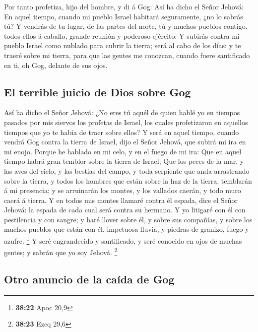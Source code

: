  Por tanto profetiza, hijo del hombre, y di á Gog: Así ha
dicho el Señor Jehová: En aquel tiempo, cuando mi pueblo Israel habitará
seguramente, ¿no lo sabrás tú?  Y vendrás de tu lugar, de
las partes del norte, tú y muchos pueblos contigo, todos ellos á
caballo, grande reunión y poderoso ejército:  Y subirás
contra mi pueblo Israel como nublado para cubrir la tierra; será al cabo
de los días: y te traeré sobre mi tierra, para que las gentes me
conozcan, cuando fuere santificado en ti, oh Gog, delante de sus ojos.

\hypertarget{el-terrible-juicio-de-dios-sobre-gog}{%
\subsection{El terrible juicio de Dios sobre
Gog}\label{el-terrible-juicio-de-dios-sobre-gog}}

 Así ha dicho el Señor Jehová: ¿No eres tú aquél de quien
hablé yo en tiempos pasados por mis siervos los profetas de Israel, los
cuales profetizaron en aquellos tiempos que yo te había de traer sobre
ellos?  Y será en aquel tiempo, cuando vendrá Gog contra la
tierra de Israel, dijo el Señor Jehová, que subirá mi ira en mi enojo.
 Porque he hablado en mi celo, y en el fuego de mi ira: Que
en aquel tiempo habrá gran temblor sobre la tierra de Israel;
 Que los peces de la mar, y las aves del cielo, y las
bestias del campo, y toda serpiente que anda arrastrando sobre la
tierra, y todos los hombres que están sobre la haz de la tierra,
temblarán á mi presencia; y se arruinarán los montes, y los vallados
caerán, y todo muro caerá á tierra.  Y en todos mis montes
llamaré contra él espada, dice el Señor Jehová: la espada de cada cual
será contra su hermano.  Y yo litigaré con él con
pestilencia y con sangre; y haré llover sobre él, y sobre sus compañías,
y sobre los muchos pueblos que están con él, impetuosa lluvia, y piedras
de granizo, fuego y azufre. \footnote{\textbf{38:22} Apoc 20,9}
 Y seré engrandecido y santificado, y seré conocido en ojos
de muchas gentes; y sabrán que yo soy Jehová. \footnote{\textbf{38:23}
  Ezeq 29,6}

\hypertarget{otro-anuncio-de-la-cauxedda-de-gog}{%
\subsection{Otro anuncio de la caída de
Gog}\label{otro-anuncio-de-la-cauxedda-de-gog}}

